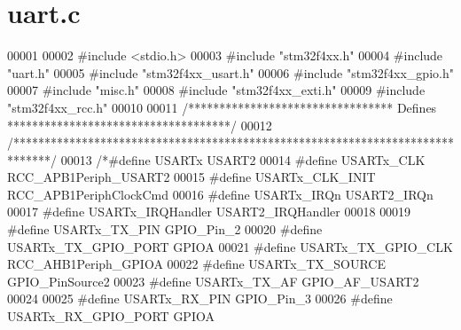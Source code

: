 \section{uart.\+c}
\label{uart_8c_source}

\begin{DoxyCode}
00001 
00002 \textcolor{preprocessor}{#}\textcolor{preprocessor}{include} \textcolor{preprocessor}{<}\textcolor{preprocessor}{stdio}\textcolor{preprocessor}{.}\textcolor{preprocessor}{h}\textcolor{preprocessor}{>}
00003 \textcolor{preprocessor}{#}\textcolor{preprocessor}{include} "stm32f4xx.h"
00004 \textcolor{preprocessor}{#}\textcolor{preprocessor}{include} "uart.h"
00005 \textcolor{preprocessor}{#}\textcolor{preprocessor}{include} "stm32f4xx_usart.h"
00006 \textcolor{preprocessor}{#}\textcolor{preprocessor}{include} "stm32f4xx_gpio.h"
00007 \textcolor{preprocessor}{#}\textcolor{preprocessor}{include} "misc.h"
00008 \textcolor{preprocessor}{#}\textcolor{preprocessor}{include} "stm32f4xx_exti.h"
00009 \textcolor{preprocessor}{#}\textcolor{preprocessor}{include} "stm32f4xx_rcc.h"
00010 
00011 \textcolor{comment}{/********************************* Defines ************************************/}
00012 \textcolor{comment}{/******************************************************************************/}
00013 \textcolor{comment}{/*#define USARTx                           USART2}
00014 \textcolor{comment}{#define USARTx\_CLK                       RCC\_APB1Periph\_USART2}
00015 \textcolor{comment}{#define USARTx\_CLK\_INIT                  RCC\_APB1PeriphClockCmd}
00016 \textcolor{comment}{#define USARTx\_IRQn                      USART2\_IRQn}
00017 \textcolor{comment}{#define USARTx\_IRQHandler                USART2\_IRQHandler}
00018 \textcolor{comment}{}
00019 \textcolor{comment}{#define USARTx\_TX\_PIN                    GPIO\_Pin\_2}
00020 \textcolor{comment}{#define USARTx\_TX\_GPIO\_PORT              GPIOA}
00021 \textcolor{comment}{#define USARTx\_TX\_GPIO\_CLK               RCC\_AHB1Periph\_GPIOA}
00022 \textcolor{comment}{#define USARTx\_TX\_SOURCE                 GPIO\_PinSource2}
00023 \textcolor{comment}{#define USARTx\_TX\_AF                     GPIO\_AF\_USART2}
00024 \textcolor{comment}{}
00025 \textcolor{comment}{#define USARTx\_RX\_PIN                    GPIO\_Pin\_3}
00026 \textcolor{comment}{#define USARTx\_RX\_GPIO\_PORT              GPIOA}

\end{DoxyCode}
